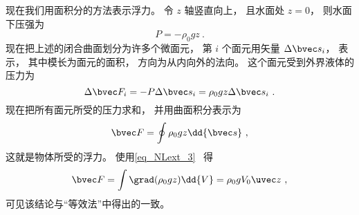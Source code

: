 现在我们用面积分的方法表示浮力。 令 $z$ 轴竖直向上， 且水面处 $z = 0$， 则水面下压强为
\begin{equation}
P = -\rho_0 g z~.
\end{equation}
现在把上述的闭合曲面划分为许多个微面元， 第 $i$ 个面元用矢量 $\Delta \bvec s_i$， 表示， 其中模长为面元的面积， 方向为从内向外的法向。 这个面元受到外界液体的压力为
\begin{equation}
\Delta \bvec F_i = -P\Delta \bvec s_i = \rho_0 g z \Delta \bvec s_i~.
\end{equation}
现在把所有面元所受的压力求和， 并用曲面积分表示为
\begin{equation}
\bvec F = \oint \rho_0 g z \dd{\bvec s}~,
\end{equation}
这就是物体所受的浮力。 使用\autoref{eq_NLext_3}~ 得
\begin{equation}
\bvec F = \int \grad(\rho_0 g z) \dd{V} = \rho_0 g V_0 \uvec z~,
\end{equation}
可见该结论与“等效法”中得出的一致。
